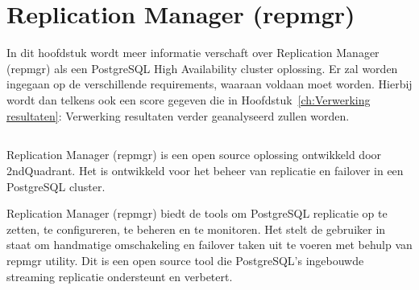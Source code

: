 
\chapter{Replication Manager (repmgr)}
\label{ch:Replication Manager (repmgr)}

In dit hoofdstuk wordt meer informatie verschaft over Replication Manager (repmgr) als een PostgreSQL High Availability cluster oplossing. Er zal worden ingegaan op de verschillende requirements, waaraan voldaan moet worden. Hierbij wordt dan telkens ook een score gegeven die in Hoofdstuk~\ref{ch:Verwerking resultaten}: Verwerking resultaten verder geanalyseerd zullen worden.

\section{}
\label{sec:Inleiding tot Replication Manager (repmgr)}

Replication Manager (repmgr) is een open source oplossing ontwikkeld door 2ndQuadrant. Het is ontwikkeld voor het beheer van replicatie en failover in een PostgreSQL cluster.

Replication Manager (repmgr) biedt de tools om PostgreSQL replicatie op te zetten, te configureren, te beheren en te monitoren. Het stelt de gebruiker in staat om handmatige omschakeling en failover taken uit te voeren met behulp van repmgr utility. Dit is een open source tool die PostgreSQL's ingebouwde streaming replicatie ondersteunt en verbetert.

\section{}
\label{sec:Requirements}

\subsection{}
\label{subsec:Must have}


